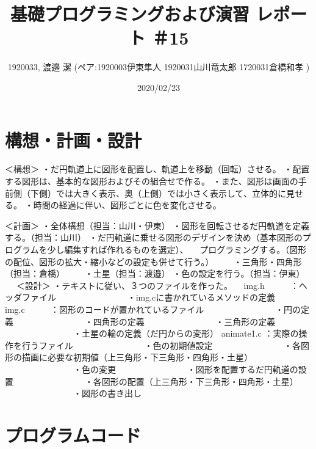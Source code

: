 \documentclass[12pt,a4j]{jarticle}
\begin{document}
\title{基礎プログラミングおよび演習 レポート ＃15}
\author{1920033, 渡邉 潔 (ペア:1920003伊東隼人 1920031山川竜太郎 1720031倉橋和孝 )}
\date{2020/02/23}
\maketitle

\section{構想・計画・設計}
＜構想＞
・だ円軌道上に図形を配置し、軌道上を移動（回転）させる。
・配置する図形は、基本的な図形およびその組合せで作る。
・また、図形は画面の手前側（下側）では大きく表示、奥（上側）では小さく表示して、立体的に見せる。
・時間の経過に伴い、図形ごとに色を変化させる。

＜計画＞
・全体構想（担当：山川・伊東）
・図形を回転させるだ円軌道を定義する。（担当：山川）
・だ円軌道に乗せる図形のデザインを決め（基本図形のプログラムを少し編集すれば作れるものを選定）、
　プログラミングする。（図形の配位、図形の拡大・縮小などの設定も併せて行う。）
　　・三角形・四角形（担当：倉橋）
　　・土星（担当：渡邉）
・色の設定を行う。（担当：伊東）
　
＜設計＞
・テキストに従い、３つのファイルを作った。
　img.h　　　：ヘッダファイル
　　　　　　　　・img.cに書かれているメソッドの定義
  img.c　　　：図形のコードが置かれているファイル
　　　　　　　　・円の定義
　　　　　　　　・四角形の定義
　　　　　　　　・三角形の定義
　　　　　　　　・土星の輪の定義（だ円からの変形）
  animate1.c ：実際の操作を行うファイル
　　　　　　　　・色の初期値設定
　　　　　　　　・各図形の描画に必要な初期値（上三角形・下三角形・四角形・土星）
　　　　　　　　・色の変更
　　　　　　　　・図形を配置するだ円軌道の設置
　　　　　　　　・各図形の配置（上三角形・下三角形・四角形・土星）
　　　　　　　　・図形の書き出し

\section{プログラムコード}
\end{document}
